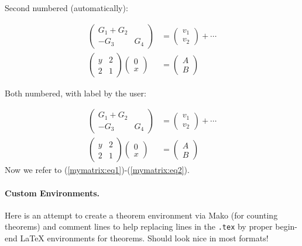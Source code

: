\documentclass[%
oneside,                 %
final,                   %
10pt]{article}
\theoremstyle{definition}
\begin{document}
\begin{enumerate}
Second numbered (automatically):

\begin{align}
\begin{pmatrix}
G_1 + G_2\\ 
-G_3 & G_4
\end{pmatrix}
&=
\begin{pmatrix}
 v_1 \\ 
 v_2
\end{pmatrix}
+ \cdots\nonumber
\\ 
\left(\begin{array}{ll}
y & 2\\ 
2 & 1
\end{array}\right)
\left(\begin{array}{ll}
0 \\ x
\end{array}\right)
&= \begin{pmatrix}
A \\ B
\end{pmatrix}
\end{align}

Both numbered, with label by the user:

\begin{align}
\begin{pmatrix}
G_1 + G_2\\ 
-G_3 & G_4
\end{pmatrix}
&=
\begin{pmatrix}
 v_1 \\ 
 v_2
\end{pmatrix}
+ \cdots \label{mymatrix:eq1}
\\ 
\label{mymatrix:eq2}
\left(\begin{array}{ll}
y & 2\\ 
2 & 1
\end{array}\right)
\left(\begin{array}{ll}
0 \\ x
\end{array}\right)
&= \begin{pmatrix}
A \\ B
\end{pmatrix}
\end{align}
Now we refer to (\ref{mymatrix:eq1})-(\ref{mymatrix:eq2}).

\paragraph{Custom Environments.}
Here is an attempt to create a theorem environment via Mako
(for counting theorems) and comment lines to help replacing lines in
the \texttt{.tex} by proper begin-end {\LaTeX} environments for theorems.
Should look nice in most formats!


\end{enumerate}
\end{document}

